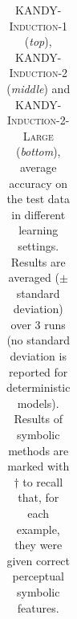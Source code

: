 \begin{table}[t]
{\begin{tabular}{lllcccc}
			\bottomrule
		\end{tabular}
	}
	\caption[Experimental results on \textsc{KANDY-Induction}]{\textsc{KANDY-Induction-1} ({\it top}), \textsc{KANDY-Induction-2} ({\it middle}) and \textsc{KANDY-Induction-2-Large} ({\it bottom}), average accuracy on the test data in different learning settings. Results are averaged ($\pm$ standard deviation) over 3 runs (no standard deviation is reported for deterministic models). %
		Results of symbolic methods are marked with $\dagger$ to recall that, for each example, they were given correct perceptual symbolic features.}
	\label{kandy:tab:acc_easy_hard}    
\end{table}




